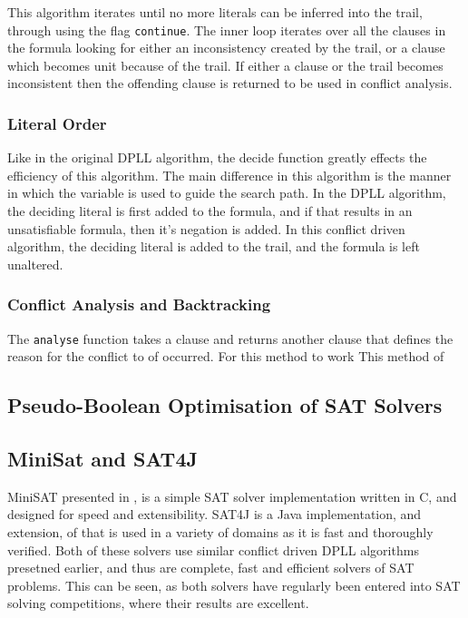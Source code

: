 This algorithm iterates until no more literals can be inferred into the trail, through using the flag \verb+continue+.
The inner loop iterates over all the clauses in the formula looking for either an inconsistency created by the trail, or a clause which becomes unit because of the trail.
If either a clause or the trail becomes inconsistent then the offending clause is returned to be used in conflict analysis.

\subsubsection{Literal Order}
Like in the original DPLL algorithm, the decide function greatly effects the efficiency of this algorithm.
The main difference in this algorithm is the manner in which the variable is used to guide the search path.
In the DPLL algorithm, the deciding literal is first added to the formula, and if that results in an unsatisfiable formula, then it's negation is added.
In this conflict driven algorithm, the deciding literal is added to the trail, and the formula is left unaltered.

\subsubsection{Conflict Analysis and Backtracking}
The \verb+analyse+ function takes a clause and returns another clause that defines the reason for the conflict to of occurred.
For this method to work
This method of \cite{stallman1976}



\subsection{Pseudo-Boolean Optimisation of SAT Solvers}



\subsection{MiniSat and SAT4J}
MiniSAT presented in \cite{een2003}, is a simple SAT solver implementation written in C, and designed for speed and extensibility.
SAT4J is a Java implementation, and extension, of that is used in a variety of domains as it is fast and thoroughly verified.
Both of these solvers use similar conflict driven DPLL algorithms presetned earlier, and thus are complete, fast and efficient solvers of SAT problems.
This can be seen, as both solvers have regularly been entered into SAT solving competitions, where their results are excellent.

